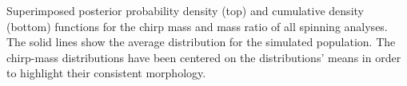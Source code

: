 \label{fig:mass_pdfs} Superimposed posterior probability density (top) and cumulative density (bottom) functions for the chirp mass and mass ratio of all spinning analyses.  The solid lines show the average distribution for the simulated population.  The chirp-mass distributions have been centered on the distributions' means in order to highlight their consistent morphology.
  